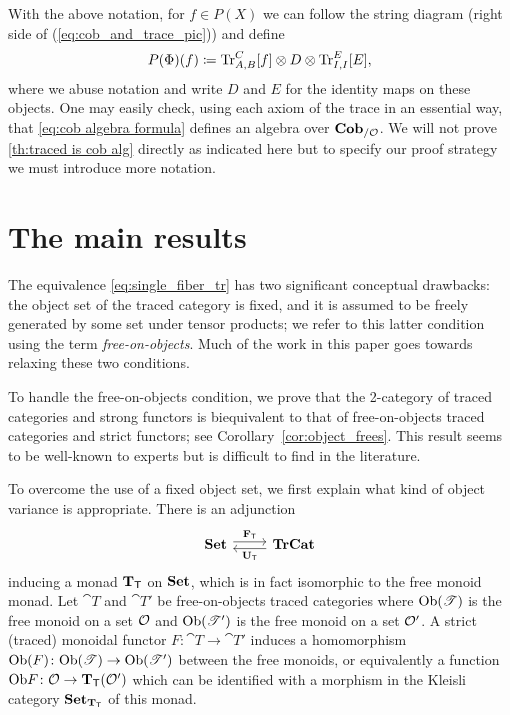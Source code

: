 \documentclass[11pt,oneside,article]{memoir}
\begin{document}
With the above notation, for $f\in P(X)$ we can follow the string diagram (right side of (\ref{eq:cob_and_trace_pic})) and define
\begin{equation}
      \label{eq:cob algebra formula}
   P(\Phi)(f)\coloneqq\operatorname{Tr}_{A,B}^C[f]\otimes D\otimes\operatorname{Tr}^E_{I,I}[E],
\end{equation}
where we abuse notation and write $D$ and $E$ for the identity maps on these objects.  One may easily check, using each axiom of the trace \cite{JoyalStreetVerity} in an essential way, that \eqref{eq:cob algebra formula} defines an algebra over $\mathbf{Cob}_{/\mathcal{O}}$.  We will not prove \ref{th:traced is cob alg} directly as indicated here but to specify our proof strategy we must introduce more notation.


\section{The main results}
      \label{sec:main_results}

The equivalence \eqref{eq:single_fiber_tr} has two significant conceptual drawbacks: the object set of the traced category is fixed, and it is assumed to be freely generated by some set under tensor products; we refer to this latter condition using the term \emph{free-on-objects}. Much of the work in this paper goes towards relaxing these two conditions. 

To handle the free-on-objects condition, we prove that the 2-category of traced categories and strong functors is biequivalent to that of free-on-objects traced categories and strict functors; see Corollary~\ref{cor:object_frees}.  This result seems to be well-known to experts but is difficult to find in the literature.

To overcome the use of a fixed object set, we first explain what kind of object variance is appropriate.  There is an adjunction
\[\Adjoint{\Set}{\TrCat}{\FT}{\UT}\]
inducing a monad $\mathbf{T}_{\mathsf{T}}$ on $\mathbf{Set}$, which is in fact isomorphic to the free monoid monad.  Let $\cat{T}$ and $\cat{T}'$ be free-on-objects traced categories where $\mathrm{Ob}(\mathscr{T})$ is the free monoid on a set $\mathcal{O}$ and $\mathrm{Ob}(\mathscr{T}')$ is the free monoid on a set $\mathcal{O}'$. A strict (traced) monoidal functor $F\colon \cat{T}\to \cat{T}'$ induces a homomorphism $\mathrm{Ob}(F)\colon\mathrm{Ob}(\mathscr{T})\to\mathrm{Ob}(\mathscr{T}')$ between the free monoids, or equivalently a function $\mathrm{Ob} F\colon\mathcal{O}\to\mathbf{T}_{\mathsf{T}}(\mathcal{O}')$ which can be identified with a morphism in the Kleisli category $\mathbf{Set}_{\mathbf{T}_{\mathsf{T}}}$ of this monad.
\end{document}
